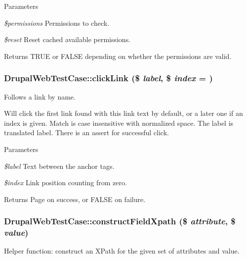 \begin{DoxyParams}{Parameters}
\item[{\em \$permissions}]Permissions to check. \item[{\em \$reset}]Reset cached available permissions. \end{DoxyParams}
\begin{DoxyReturn}{Returns}
TRUE or FALSE depending on whether the permissions are valid. 
\end{DoxyReturn}
\hypertarget{class_drupal_web_test_case_a716c6eef22f216695376ea5b531ce9a1}{
\subsubsection[{clickLink}]{\setlength{\rightskip}{0pt plus 5cm}DrupalWebTestCase::clickLink (\$ {\em label}, \/  \$ {\em index} = {})}}
\label{class_drupal_web_test_case_a716c6eef22f216695376ea5b531ce9a1}
Follows a link by name.

Will click the first link found with this link text by default, or a later one if an index is given. Match is case insensitive with normalized space. The label is translated label. There is an assert for successful click.


\begin{DoxyParams}{Parameters}
\item[{\em \$label}]Text between the anchor tags. \item[{\em \$index}]Link position counting from zero. \end{DoxyParams}
\begin{DoxyReturn}{Returns}
Page on success, or FALSE on failure. 
\end{DoxyReturn}
\hypertarget{class_drupal_web_test_case_afec52d7a3b6e492c3230dcc2b22bd7bb}{
\subsubsection[{constructFieldXpath}]{\setlength{\rightskip}{0pt plus 5cm}DrupalWebTestCase::constructFieldXpath (\$ {\em attribute}, \/  \$ {\em value})}}
\label{class_drupal_web_test_case_afec52d7a3b6e492c3230dcc2b22bd7bb}
Helper function: construct an XPath for the given set of attributes and value.


